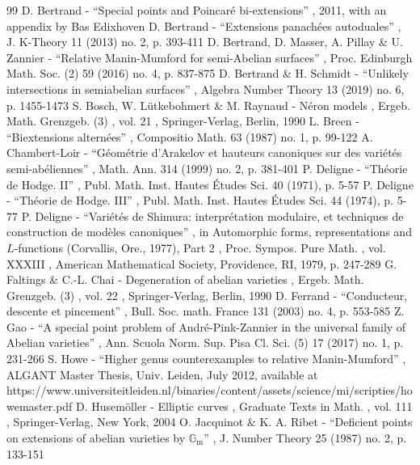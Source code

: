 \documentclass[11pt]{article}
\theoremstyle{plain}
\theoremstyle{definition}
\numberwithin{equation}{subsection}
\begin{document}
\begin{thebibliography}{99}
 D. Bertrand - “Special points and Poincaré bi-extensions” , 2011, with an appendix by Bas Edixhoven
 D. Bertrand - “Extensions panachées autoduales” , J. K-Theory 11 (2013) no. 2, p. 393-411
 D. Bertrand, D. Masser, A. Pillay \& U. Zannier - “Relative Manin-Mumford for semi-Abelian surfaces” , Proc. Edinburgh Math. Soc. (2) 59 (2016) no. 4, p. 837-875
 D. Bertrand \& H. Schmidt - “Unlikely intersections in semiabelian surfaces” , Algebra Number Theory 13 (2019) no. 6, p. 1455-1473
 S. Bosch, W. Lütkebohmert \& M. Raynaud - Néron models , Ergeb. Math. Grenzgeb. (3) , vol. 21 , Springer-Verlag, Berlin, 1990
 L. Breen - “Biextensions alternées” , Compositio Math. 63 (1987) no. 1, p. 99-122
 A. Chambert-Loir - “Géométrie d’Arakelov et hauteurs canoniques sur des variétés semi-abéliennes” , Math. Ann. 314 (1999) no. 2, p. 381-401
 P. Deligne - “Théorie de Hodge. II” , Publ. Math. Inst. Hautes Études Sci. 40 (1971), p. 5-57
 P. Deligne - “Théorie de Hodge. III” , Publ. Math. Inst. Hautes Études Sci. 44 (1974), p. 5-77
 P. Deligne - “Variétés de Shimura: interprétation modulaire, et techniques de construction de modèles canoniques” , in Automorphic forms, representations and $L$-functions (Corvallis, Ore., 1977), Part 2 , Proc. Sympos. Pure Math. , vol. XXXIII , American Mathematical Society, Providence, RI, 1979, p. 247-289
 G. Faltings \& C.-L. Chai - Degeneration of abelian varieties , Ergeb. Math. Grenzgeb. (3) , vol. 22 , Springer-Verlag, Berlin, 1990
 D. Ferrand - “Conducteur, descente et pincement” , Bull. Soc. math. France 131 (2003) no. 4, p. 553-585
 Z. Gao - “A special point problem of André-Pink-Zannier in the universal family of Abelian varieties” , Ann. Scuola Norm. Sup. Pisa Cl. Sci. (5) 17 (2017) no. 1, p. 231-266
 S. Howe - “Higher genus counterexamples to relative Manin-Mumford” , ALGANT Master Thesis, Univ. Leiden, July 2012, available at https://www.universiteitleiden.nl/binaries/content/assets/science/mi/scripties/howemaster.pdf
 D. Husemöller - Elliptic curves , Graduate Texts in Math. , vol. 111 , Springer-Verlag, New York, 2004
 O. Jacquinot \& K. A. Ribet - “Deficient points on extensions of abelian varieties by $\mathbb{G}_\mathrm{m}$” , J. Number Theory 25 (1987) no. 2, p. 133-151

\end{thebibliography}
\end{document}
